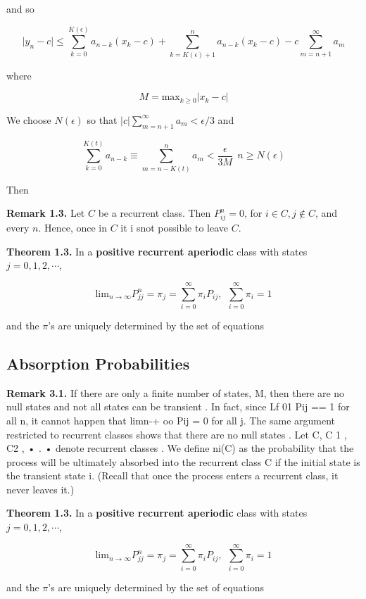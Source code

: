 \documentclass[12pt]{article}
\theoremstyle{nonumberbreak}
\begin{document}
and so 

$$
\vert y_n - c \vert \le \sum_{k=0}^{K(\epsilon)} a_{n-k} (x_k -c) + \sum_{k=K(\epsilon)+1}^n a_{n-k} (x_k -c) - c \sum_{m=n+1}^\infty a_m
$$

where 

$$
M = \mathrm{max}_{k \ge 0} \vert x_k - c \vert
$$


We choose $N(\epsilon)$ so that $|c| \sum_{m=n+1}^\infty a_m < \epsilon /3$ and 

$$
\sum_{k=0}^{K(t)} a_{n-k} \equiv \sum_{m=n-K(t)}^n a_m < \frac{\epsilon}{3M} \ \ n \ge N(\epsilon)
$$

Then 


\textbf{Remark 1.3.} Let $C$ be a recurrent class. Then $P_{ij}^n = 0$, for $i \in C, j \notin C$, and every $n$. Hence, once in $C$ it i snot possible to leave $C$. 


\begin{theorem}
\textbf{Theorem 1.3.} In a \textbf{positive recurrent aperiodic} class with states $j=0,1,2,\cdots$, 

$$
\mathrm{lim}_{n\to \infty} P^n_{jj} = \pi_j = \sum_{i=0}^\infty \pi_i P_{ij}, \ \ \sum_{i=0}^\infty \pi_i =1
$$

and the $\pi$'s are uniquely determined by the set of equations
\end{theorem}



\subsection{Absorption Probabilities}

\textbf{Remark 3.1.} If there are only a finite number of states, M, then there
are no null states and not all states can be transient . In fact, since
Lf 01 Pij == 1 for all n, it cannot happen that limn-+ oo Pij = 0 for all j.
The same argument restricted to recurrent classes shows that there are
no null states . Let C, C 1 , C2 , • . • denote recurrent classes . We define
ni(C) as the probability that the process will be ultimately absorbed into
the recurrent class C if the initial state is the transient state i. (Recall
that once the process enters a recurrent class, it never leaves it.)




\begin{theorem}
\textbf{Theorem 1.3.} In a \textbf{positive recurrent aperiodic} class with states $j=0,1,2,\cdots$, 

$$
\mathrm{lim}_{n\to \infty} P^n_{jj} = \pi_j = \sum_{i=0}^\infty \pi_i P_{ij}, \ \ \sum_{i=0}^\infty \pi_i =1
$$

and the $\pi$'s are uniquely determined by the set of equations
\end{theorem}
\end{document}
